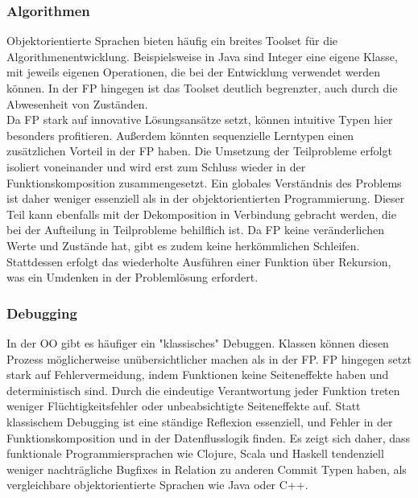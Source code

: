 \subsubsection{Algorithmen}
Objektorientierte Sprachen bieten häufig ein breites Toolset für die Algorithmenentwicklung. Beispielsweise in Java sind Integer eine eigene Klasse, mit jeweils eigenen Operationen, die bei der Entwicklung verwendet werden können. In der FP hingegen ist das Toolset deutlich begrenzter, auch durch die Abwesenheit von Zuständen.
\\
Da FP stark auf innovative Lösungsansätze setzt, können intuitive Typen hier besonders profitieren.
Außerdem könnten sequenzielle Lerntypen einen zusätzlichen Vorteil in der FP haben. Die Umsetzung der Teilprobleme erfolgt isoliert voneinander und wird erst zum Schluss wieder in der Funktionskomposition zusammengesetzt. Ein globales Verständnis des Problems ist daher weniger essenziell als in der objektorientierten Programmierung. Dieser Teil kann ebenfalls mit der Dekomposition in Verbindung gebracht werden, die bei der Aufteilung in Teilprobleme behilflich ist.
Da FP keine veränderlichen Werte und Zustände hat, gibt es zudem keine herkömmlichen Schleifen. Stattdessen erfolgt das wiederholte Ausführen einer Funktion über Rekursion, was ein Umdenken in der Problemlösung erfordert.

\subsubsection{Debugging}
In der OO gibt es häufiger ein "klassisches" Debuggen. Klassen können diesen Prozess möglicherweise unübersichtlicher machen als in der FP. FP hingegen setzt stark auf Fehlervermeidung, indem Funktionen keine Seiteneffekte haben und deterministisch sind. Durch die eindeutige Verantwortung jeder Funktion treten weniger Flüchtigkeitsfehler oder unbeabsichtigte Seiteneffekte auf. Statt klassischem Debugging ist eine ständige Reflexion essenziell, und Fehler in der Funktionskomposition und in der Datenflusslogik finden.
Es zeigt sich daher, dass funktionale Programmiersprachen wie Clojure, Scala und Haskell tendenziell weniger nachträgliche Bugfixes in Relation zu anderen Commit Typen haben, als vergleichbare objektorientierte Sprachen wie Java oder C++.

